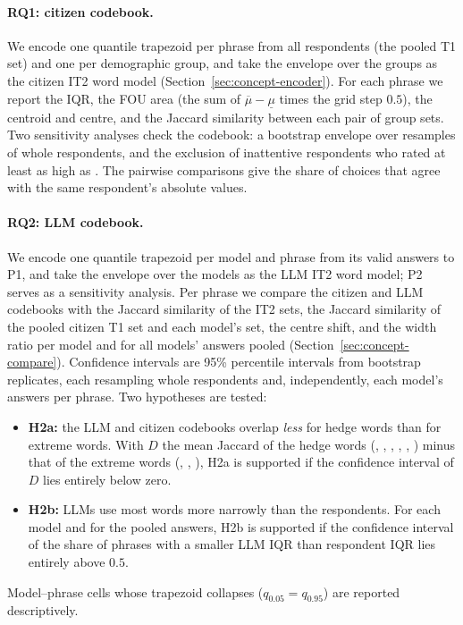 \paragraph{RQ1: citizen codebook.}
We encode one quantile trapezoid per phrase from all respondents (the pooled T1 set) and one per demographic group, and
take the envelope over the groups as the citizen IT2 word model (Section~\ref{sec:concept-encoder}).
For each phrase we report the IQR, the FOU area (the sum of $\overline{\mu} - \underline{\mu}$ times the grid step
$0.5$), the centroid and centre, and the Jaccard similarity between each pair of group sets.
Two sensitivity analyses check the codebook: a bootstrap envelope over \WoneBootB{} resamples of whole respondents, and
the exclusion of inattentive respondents who rated  at least as high as .
The pairwise comparisons give the share of choices that agree with the same respondent's absolute values.

\paragraph{RQ2: LLM codebook.}
We encode one quantile trapezoid per model and phrase from its valid answers to P1, and take the envelope over the models
as the LLM IT2 word model; P2 serves as a sensitivity analysis.
Per phrase we compare the citizen and LLM codebooks with the Jaccard similarity of the IT2 sets, the Jaccard similarity of the pooled
citizen T1 set and each model's set, the centre shift, and the width ratio per model and for all models' answers pooled
(Section~\ref{sec:concept-compare}).
Confidence intervals are 95\% percentile intervals from \WtwoBootB{} bootstrap replicates, each resampling whole
respondents and, independently, each model's answers per phrase.
Two hypotheses are tested:
\begin{itemize}
\item \textbf{H2a:} the LLM and citizen codebooks overlap \emph{less} for hedge words than for extreme words.
With $D$ the mean Jaccard of the \WNHedge{} hedge words (, ,
, , , ) minus that of the \WNExtreme{} extreme words
(, , ), H2a is supported if the confidence interval of $D$
lies entirely below zero.
\item \textbf{H2b:} LLMs use most words more narrowly than the respondents.
For each model and for the pooled answers, H2b is supported if the confidence interval of the share of phrases with a
smaller LLM IQR than respondent IQR lies entirely above $0.5$.
\end{itemize}
Model--phrase cells whose trapezoid collapses ($q_{0.05} = q_{0.95}$) are reported descriptively.

